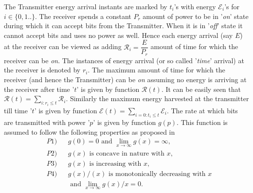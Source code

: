 The Transmitter energy arrival instants are marked by $t_i$'s with energy $\mathcal{E}_i$'s for $i \in \{0,1..\}$. The receiver spends a constant $P_{r}$ amount of power to be in '\textit{on}' state during which it can accept bits from the Transmitter. When it is in '\textit{off}' state it cannot accept bits and uses no power as well. Hence each energy arrival (say $E$) at the receiver can be viewed as adding $\mathcal{R}_i=\dfrac{E}{P_{r}}$ amount of time for which the receiver can be \textit{on}. The instances of energy arrival (or so called '\textit{time}' arrival) at the receiver is denoted by $r_i$. The maximum amount of time for which the receiver (and hence the Transmitter) can be \textit{on} assuming no energy is arriving at the receiver after time '$t$' is given by function $\mathcal{R}(t)$. It can be easily seen that $\mathcal{R}(t)=\underset{i:r_i\le t}{\sum}\mathcal{R}_i$. Similarly the maximum energy harvested at the transmitter till time '$t$' is given by function $\mathcal{E}(t)=\underset{i=0:t_i\le t}{\sum}\mathcal{E}_i$. The rate at which bits are transmitted with power '$p$' is given by function $g(p)$. This function is assumed to follow the following properties as proposed in \cite{Yang} 
\begin{align}
&P1) &&g(0)=0\text{ and }\lim_{x\rightarrow \infty} g(x)= \infty,\label{property_0_infty}
\\
&P2) &&g(x)\text{ is concave in nature with } x,\label{property_concave}
\\
&P3) &&g(x)\text{ is increasing with } x,\label{property_increasing}
\\ 
&P4) &&g(x)/(x) \text{ is monotonically decreasing with } x\nonumber
\\
&    &&\text{ and } \lim_{x\rightarrow \infty} g(x)/x= 0.\label{property_decreasing}
\end{align}


